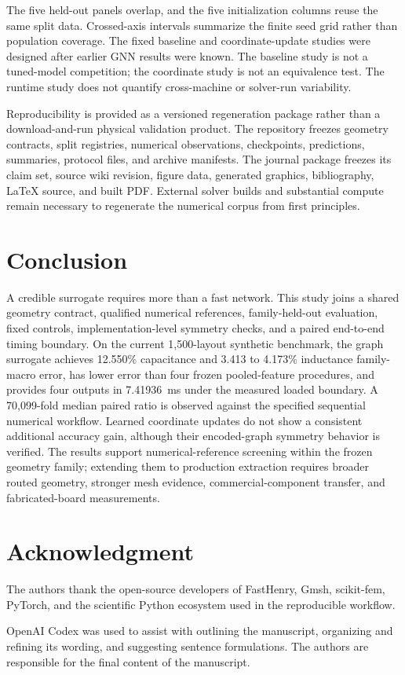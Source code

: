 \documentclass[journal]{IEEEtran}
\begin{document}
The five held-out panels overlap, and the five initialization columns reuse the same split data. Crossed-axis intervals summarize the finite seed grid rather than population coverage. The fixed baseline and coordinate-update studies were designed after earlier GNN results were known. The baseline study is not a tuned-model competition; the coordinate study is not an equivalence test. The runtime study does not quantify cross-machine or solver-run variability.

Reproducibility is provided as a versioned regeneration package rather than a download-and-run physical validation product. The repository freezes geometry contracts, split registries, numerical observations, checkpoints, predictions, summaries, protocol files, and archive manifests. The journal package freezes its claim set, source wiki revision, figure data, generated graphics, bibliography, LaTeX source, and built PDF. External solver builds and substantial compute remain necessary to regenerate the numerical corpus from first principles.

\section{Conclusion}
A credible surrogate requires more than a fast network. This study joins a shared geometry contract, qualified numerical references, family-held-out evaluation, fixed controls, implementation-level symmetry checks, and a paired end-to-end timing boundary. On the current 1,500-layout synthetic benchmark, the graph surrogate achieves 12.550\% capacitance and 3.413 to 4.173\% inductance family-macro error, has lower error than four frozen pooled-feature procedures, and provides four outputs in 7.41936~ms under the measured loaded boundary. A 70,099-fold median paired ratio is observed against the specified sequential numerical workflow. Learned coordinate updates do not show a consistent additional accuracy gain, although their encoded-graph symmetry behavior is verified. The results support numerical-reference screening within the frozen geometry family; extending them to production extraction requires broader routed geometry, stronger mesh evidence, commercial-component transfer, and fabricated-board measurements.

\section*{Acknowledgment}
The authors thank the open-source developers of FastHenry, Gmsh, scikit-fem, PyTorch, and the scientific Python ecosystem used in the reproducible workflow.

OpenAI Codex was used to assist with outlining the manuscript, organizing and refining its wording, and suggesting sentence formulations. The authors are responsible for the final content of the manuscript.



\end{document}
